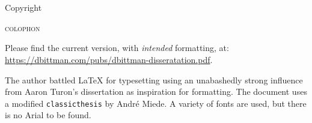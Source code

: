 \thispagestyle{empty}

\hfill

\vfill

\begingroup
\begin{wide}
    \begin{center}
        \noindent\myName \\ \textit{\myTitle} \\ %
        Copyright \textcopyright\ \myTime
    \end{center}
\end{wide}
\endgroup

\vfill

\noindent\textsc{colophon}
\medskip

\noindent Please find the current version, with \emph{intended} formatting, at:\\
\url{https://dbittman.com/pubs/dbittman-disseratation.pdf}.

\medskip

\noindent The author battled \LaTeX\xspace for typesetting using an unabashedly strong influence from Aaron
Turon's dissertation
as inspiration for formatting. The document uses a modified \texttt{classicthesis} by
André Miede. A variety of fonts are used, but there is no Arial to be found.
%
%
%
%
%
